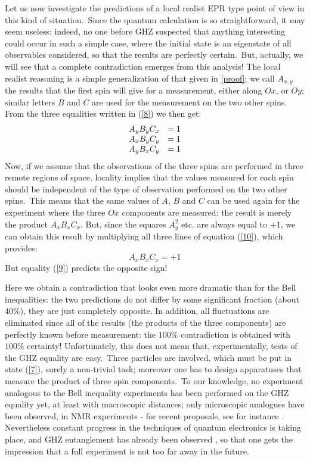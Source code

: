 \documentclass[12pt,onecolumn]{article}%
\begin{document}
Let us now investigate the predictions of a local realist EPR type point of
view in this kind of situation.\ Since the quantum calculation is so
straightforward, it may seem useless: indeed, no one before GHZ suspected that
anything interesting could occur in such a simple case, where the initial
state is an eigenstate of all observables considered, so that the results are
perfectly certain.\ But, actually, we will see that a complete contradiction
emerges from this analysis! The local realist reasoning is a simple
generalization of that given in \ref{proof}; we call $A_{x,y}$ the results
that the first spin will give for a measurement, either along $Ox$, or $Oy$;
similar letters $B$ and $C$ are used for the measurement on the two other
spins. From the three equalities written in (\ref{8}) we then get:
\begin{equation}%
\begin{array}
[c]{ll}%
A_{y}B_{y}C_{x} & =1\\
A_{x}B_{y}C_{y} & =1\\
A_{y}B_{x}C_{y} & =1
\end{array}
\label{10}%
\end{equation}
Now, if we assume that the observations of the three spins are performed in
three remote regions of space, locality implies that the values measured for
each spin should be independent of the type of observation performed on the
two other spins.\ This means that the same values of $A$, $B$ and $C$ can be
used again for the experiment where the three $Ox$ components are measured:
the result is merely the product $A_{x}B_{x}C_{x}$. But, since the squares
$A_{y}^{2}$ etc. are always equal to $+1$, we can obtain this result by
multiplying all three lines of equation (\ref{10}), which provides:
\begin{equation}
A_{x}B_{x}C_{x}=+1 \label{11}%
\end{equation}
But equality (\ref{9}) predicts the opposite sign!

Here we obtain a contradiction that looks even more dramatic than for the Bell
inequalities: the two predictions do not differ by some significant fraction
(about $40\%$), they are just completely opposite. In addition, all
fluctuations are eliminated since all of the results (the products of the
three components) are perfectly known before measurement: the $100\%$
contradiction is obtained with $100\%$ certainty! Unfortunately, this does not
mean that, experimentally, tests of the GHZ equality are easy.\ Three
particles are involved, which must be put in state (\ref{7}), surely a
non-trivial task; moreover one has to design apparatuses that measure the
product of three spin components.\ To our knowledge, no experiment analogous
to the Bell inequality experiments has been performed on the GHZ equality yet,
at least with macroscopic distances; only microscopic analogues have been
observed, in NMR experiments \cite{NMR-GHZ} - for recent proposals, see for
instance \cite{NMR-GHZ-2} \cite{NMR-GHZ-3}. Nevertheless constant progress in
the techniques of quantum electronics is taking place, and GHZ entanglement
has already been observed \cite{GHZ-1} \cite{GHZ-1bis}, so that one gets the
impression that a full experiment is not too far away in the future.
\end{document}
